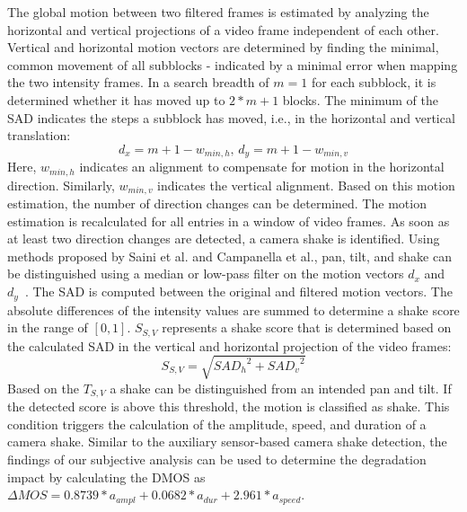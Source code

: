 The global motion between two filtered frames is estimated by analyzing the horizontal and vertical projections of a video frame independent of each other.
Vertical and horizontal motion vectors are determined by finding the minimal, common movement of all subblocks - indicated by a minimal error when mapping the two intensity frames. 
In a search breadth of $m = 1$ for each subblock, it is determined whether it has moved up to $2 * m + 1$ blocks.
The minimum of the \ac{SAD} indicates the steps a subblock has moved, i.e., in the horizontal and vertical translation:
\begin{equation}\label{eq:554_mvs}
d_x = m + 1 - w_{min, h} \text{, } d_y = m + 1 - w_{min, v}
\end{equation}
Here, $w_{min, h}$ indicates an alignment to compensate for motion in the horizontal direction.
Similarly, $w_{min, v}$ indicates the vertical alignment.
Based on this motion estimation, the number of direction changes can be determined.
The motion estimation is recalculated for all entries in a window of video frames.
As soon as at least two direction changes are detected, a camera shake is identified.
Using methods proposed by Saini et al. and Campanella et al., pan, tilt, and shake can be distinguished using a median or low-pass filter on the motion vectors $d_x$ and $d_y$~\cite{Campanella2007,Saini2012}. 
The \ac{SAD} is computed between the original and filtered motion vectors. 
The absolute differences of the intensity values are summed to determine a shake score in the range of $[0, 1]$.
$S_{S, V}$ represents a shake score that is determined based on the calculated \ac{SAD} in the vertical and horizontal projection of the video frames:
\begin{equation}
 S_{S, V} = \sqrt{{SAD_{h}}^2 + {SAD_{v}}^2}
\end{equation}
 Based on the $T_{S,V}$ a shake can be distinguished from an intended pan and tilt.
 If the detected score is above this threshold, the motion is classified as shake.
 This condition triggers the calculation of the amplitude, speed, and duration of a camera shake.
 Similar to the auxiliary sensor-based camera shake detection, the findings of our subjective analysis can be used to determine the degradation impact by calculating the \ac{DMOS} as $\Delta MOS = 0.8739 * a_{ampl} + 0.0682  * a_{dur} +  2.961 * a_{speed}$.
